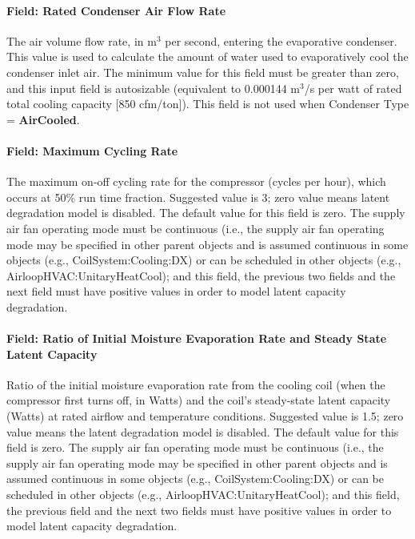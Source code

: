 \paragraph{Field: Rated Condenser Air Flow Rate}\label{field-rated-condenser-air-flow-rate-2}

The air volume flow rate, in m\(^{3}\) per second, entering the evaporative condenser. This value is used to calculate the amount of water used to evaporatively cool the condenser inlet air. The minimum value for this field must be greater than zero, and this input field is autosizable (equivalent to 0.000144 m\(^{3}\)/s per watt of rated total cooling capacity {[}850 cfm/ton{]}). This field is not used when Condenser Type = \textbf{AirCooled}.

\paragraph{Field: Maximum Cycling Rate}\label{field-maximum-cycling-rate}

The maximum on-off cycling rate for the compressor (cycles per hour), which occurs at 50\% run time fraction. Suggested value is 3; zero value means latent degradation model is disabled. The default value for this field is zero. The supply air fan operating mode must be continuous (i.e., the supply air fan operating mode may be specified in other parent objects and is assumed continuous in some objects (e.g., CoilSystem:Cooling:DX) or can be scheduled in other objects (e.g., AirloopHVAC:UnitaryHeatCool); and this field, the previous two fields and the next field must have positive values in order to model latent capacity degradation.

\paragraph{Field: Ratio of Initial Moisture Evaporation Rate and Steady State Latent Capacity}\label{field-ratio-of-initial-moisture-evaporation-rate-and-steady-state-latent-capacity}

Ratio of the initial moisture evaporation rate from the cooling coil (when the compressor first turns off, in Watts) and the coil's steady-state latent capacity (Watts) at rated airflow and temperature conditions. Suggested value is 1.5; zero value means the latent degradation model is disabled. The default value for this field is zero. The supply air fan operating mode must be continuous (i.e., the supply air fan operating mode may be specified in other parent objects and is assumed continuous in some objects (e.g., CoilSystem:Cooling:DX) or can be scheduled in other objects (e.g., AirloopHVAC:UnitaryHeatCool); and this field, the previous field and the next two fields must have positive values in order to model latent capacity degradation.

